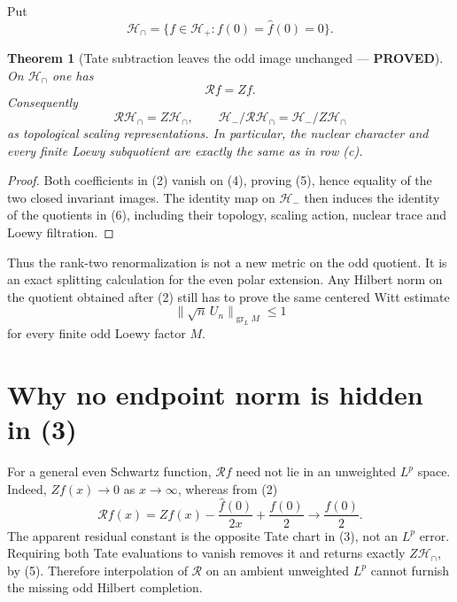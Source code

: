 \documentclass[11pt]{article}
\newcommand{\PROVED}{\textcolor{green!40!black}{\textbf{PROVED}}}
\newtheorem{theorem}{Theorem}
\begin{document}
Put
\begin{equation}
 \mathcal H_\cap=\{f\in\mathcal H_+:f(0)=\widehat f(0)=0\}.   \tag{4}
\end{equation}

\begin{theorem}[Tate subtraction leaves the odd image unchanged ---
\PROVED]
On $\mathcal H_\cap$ one has
\begin{equation}
                       \mathcal Rf=Zf.                        \tag{5}
\end{equation}
Consequently
\begin{equation}
 \mathcal R\mathcal H_\cap=Z\mathcal H_\cap,
 \qquad
 \mathcal H_-/\mathcal R\mathcal H_\cap
       =\mathcal H_-/Z\mathcal H_\cap                       \tag{6}
\end{equation}
as topological scaling representations.  In particular, the nuclear
character and every finite Loewy subquotient are exactly the same as in
row (c).
\end{theorem}

\begin{proof}
Both coefficients in (2) vanish on (4), proving (5), hence equality of
the two closed invariant images.  The identity map on $\mathcal H_-$ then
induces the identity of the quotients in (6), including their topology,
scaling action, nuclear trace and Loewy filtration.
\end{proof}

Thus the rank-two renormalization is not a new metric on the odd quotient.
It is an exact splitting calculation for the even polar extension.  Any
Hilbert norm on the quotient obtained after (2) still has to prove the
same centered Witt estimate
\begin{equation}
 \bigl\|\sqrt n\,U_n\bigr\|_{\operatorname{gr}_L M}\leq1     \tag{7}
\end{equation}
for every finite odd Loewy factor $M$.

\section{Why no endpoint norm is hidden in (3)}

For a general even Schwartz function, $\mathcal Rf$ need not lie in an
unweighted $L^p$ space.  Indeed, $Zf(x)\to0$ as $x\to\infty$, whereas
from (2)
\begin{equation}
 \mathcal Rf(x)=Zf(x)-\frac{\widehat f(0)}{2x}+\frac{f(0)}2
       \longrightarrow\frac{f(0)}2.                          \tag{8}
\end{equation}
The apparent residual constant is the opposite Tate chart in (3), not an
$L^p$ error.  Requiring both Tate evaluations to vanish removes it and
returns exactly $Z\mathcal H_\cap$, by (5).  Therefore interpolation of
$\mathcal R$ on an ambient unweighted $L^p$ cannot furnish the missing odd
Hilbert completion.
\end{document}
